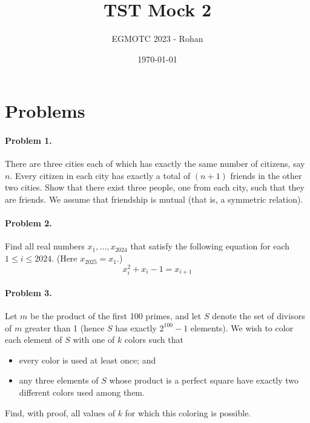 \documentclass[12pt]{article}
\title{TST Mock 2}
\author{EGMOTC 2023 - Rohan}
\date{\today}
\begin{document}
\maketitle

\newcommand{\localtextbulletone}{\textcolor{black}{\raisebox{.45ex}{\rule{.6ex}{.6ex}}}}
\renewcommand{\labelitemi}{\localtextbulletone}

\section*{Problems}
\vspace{1cm}
\thispagestyle{empty}

\paragraph{\textbf{Problem 1.}} There are three cities each of which has exactly the same number of citizens, say $n$. Every citizen in each city has exactly a total of $(n+1)$ friends in the other two cities. Show that there exist three people, one from each city, such that they are friends. We assume that friendship is mutual (that is, a symmetric relation).

\paragraph{\textbf{Problem 2.}} Find all real numbers $x_1, \dots, x_{2024}$ that satisfy the following equation for each $1 \le i \le 2024$. (Here $x_{2025} = x_1$.)
\[ x_i^2 + x_i - 1 = x_{i+1} \]

\paragraph{\textbf{Problem 3.}} Let $m$ be the product of the first 100 primes, and let $S$ denote the set of divisors of $m$ greater than 1 (hence $S$ has exactly $2^{100} - 1$ elements). We wish to color each element of $S$ with one of $k$ colors such that
\begin{itemize}
    \item every color is used at least once; and
    \item any three elements of $S$ whose product is a perfect square have exactly two different colors used among them.
\end{itemize}
Find, with proof, all values of $k$ for which this coloring is possible.
\end{document}
